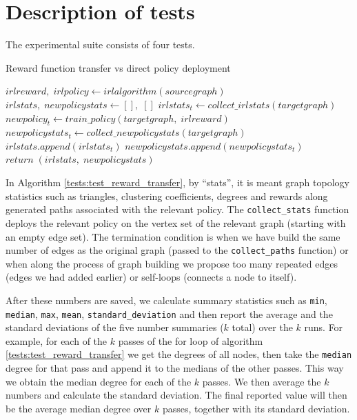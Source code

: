 \documentclass{report}
\numberwithin{equation}{section}
\numberwithin{figure}{section}
\numberwithin{table}{section}
\numberwithin{algorithm}{section}
\begin{document}

\section{Description of tests}
\label{sec:test_description}
The experimental suite consists of four tests.
\begin{algorithm}
  \caption{Reward function transfer vs direct policy deployment}
  \label{tests:test_reward_transfer}
  \begin{algorithmic}
    \State $irlreward,\; irlpolicy \gets irlalgorithm(sourcegraph)$
    \State $irlstats,\; newpolicystats \gets [],\; []$
    \State $irlstats_t \gets collect\_irlstats(targetgraph)$
    \State $newpolicy_t \gets train\_policy(targetgraph,\; irlreward)$
    \State $newpolicystats_t \gets collect\_newpolicystats(targetgraph)$
    \State $irlstats.append(irlstats_t)$
    \State $newpolicystats.append(newpolicystats_t)$
    \EndFor
    \State $return\; (irlstats,\; newpolicystats)$
  \end{algorithmic}
\end{algorithm}
In Algorithm \ref{tests:test_reward_transfer}, by ``stats'', it is meant 
graph topology statistics such as triangles, clustering coefficients, 
degrees and rewards along generated paths associated with the 
relevant policy. The \verb|collect_stats| function deploys the relevant 
policy on the vertex set of the relevant graph (starting with an 
empty edge set). The termination condition is when we have build the same 
number of edges as the original graph (passed to the \verb|collect_paths|
function) or when along the process of graph building we propose 
too many repeated edges (edges we had added earlier) or 
self-loops (connects a node to itself).

After these numbers are saved, we calculate summary 
statistics such as \verb|min|, \verb|median|, \verb|max|, 
\verb|mean|, \verb|standard_deviation| and 
then report the average and the standard deviations of the five number 
summaries ($k$ total) over the $k$ runs. For example, for each of the 
$k$ passes of the for loop of algorithm \ref{tests:test_reward_transfer} 
we get the degrees of all nodes, then take the \verb|median| degree for 
that pass and append it to the medians of the other passes. This way 
we obtain the median degree for each of the $k$ passes. We then average 
the $k$ numbers and calculate the standard deviation. The final reported 
value will then be the average median degree over $k$ passes, together 
with its standard deviation.
\end{document}

